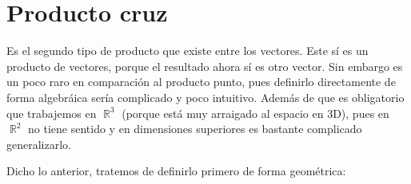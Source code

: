 \documentclass[12pt, fleqn]{report}                             %
\newcommand \Quote {\qq}                                        %
\theoremstyle{break}                                            %
\DeclareMathOperator \Reals        {\mathbb{R}}                 %
\begin{document}
        
        \clearpage
        \section{Producto cruz}
        
            Es el segundo tipo de producto que existe entre los vectores. Este sí es un producto \Quote{genuino} de vectores, porque el resultado ahora sí es otro vector. Sin embargo es un poco raro en comparación al producto punto, pues definirlo directamente de forma algebráica sería complicado y poco intuitivo. Además de que es obligatorio que trabajemos en $\Reals^3$ (porque está muy arraigado al espacio en 3D), pues en $\Reals^2$ no tiene sentido y en dimensiones superiores es bastante complicado generalizarlo.
            
            Dicho lo anterior, tratemos de definirlo primero de forma geométrica:
            
            
\end{document}

